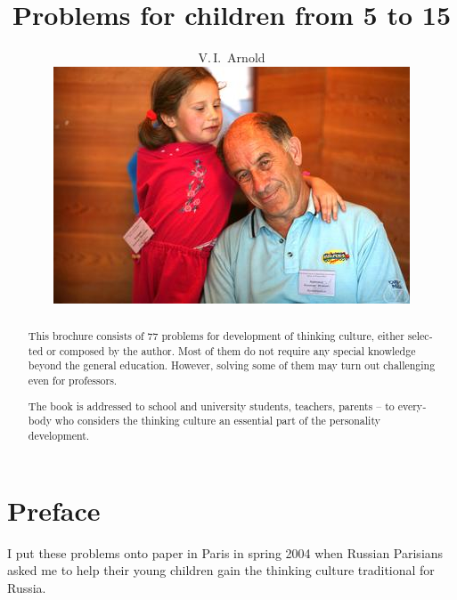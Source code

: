 
\setdefaultlanguage[variant=british]{english}

\title{Problems for children from 5 to 15}

\author{V.\,I.~Arnold
\vspace*{2cm}\\ 
\includegraphics[width=\linewidth]{photo-arnold_small}
}
\date{}


\maketitle
\thispagestyle{empty}
\clearpage 
\setcounter{page}{1}
\begin{abstract}
This brochure consists of 77 problems for development of thinking culture, either selected or composed by the author.
Most of them do not require any special knowledge beyond the general education. However, solving some of them may
turn out challenging even for professors.

The book is addressed to school and university students, teachers, parents -- to everybody who considers the thinking culture 
an essential part of the personality development.
\end{abstract}
\clearpage 

\section*{Preface}
I put these problems onto paper in Paris in spring 2004 when Russian Parisians asked me to help
their young children gain the thinking culture traditional for Russia.

